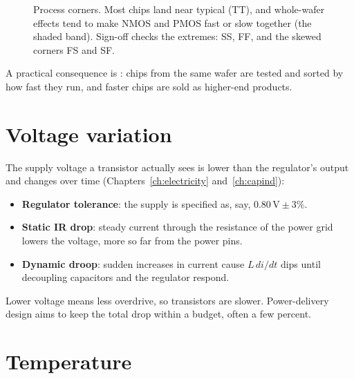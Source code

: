 \begin{figure}[h]
\centering
{}
\caption{Process corners. Most chips land near typical (TT), and whole-wafer effects tend to make NMOS and PMOS fast or slow together (the shaded band). Sign-off checks the extremes: SS, FF, and the skewed corners FS and SF.}
\label{fig:corners}
\end{figure}

A practical consequence is : chips from the same wafer are tested and sorted by how fast they run, and faster chips are sold as higher-end products.

\section{Voltage variation}

The supply voltage a transistor actually sees is lower than the regulator's output and changes over time (Chapters~\ref{ch:electricity} and~\ref{ch:capind}):
\begin{itemize}
  \item \textbf{Regulator tolerance}: the supply is specified as, say, $0.80\,\text{V} \pm 3\%$.
  \item \textbf{Static IR drop}: steady current through the resistance of the power grid lowers the voltage, more so far from the power pins.
  \item \textbf{Dynamic droop}: sudden increases in current cause $L\,di/dt$ dips until decoupling capacitors and the regulator respond.
\end{itemize}
Lower voltage means less overdrive, so transistors are slower. Power-delivery design aims to keep the total drop within a budget, often a few percent.

\section{Temperature}

